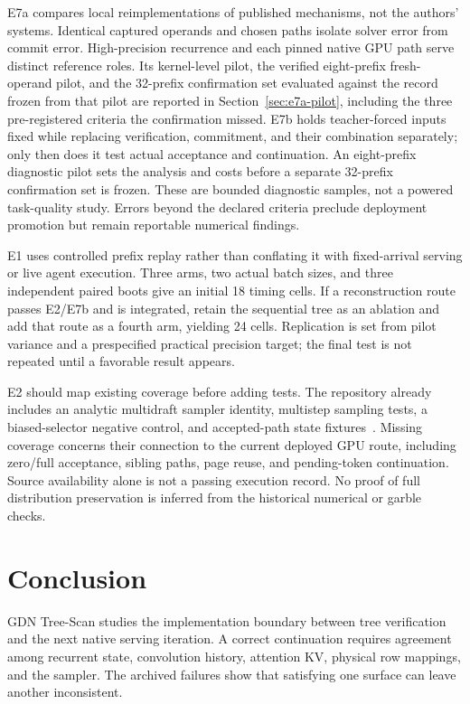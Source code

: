 \documentclass[conference]{IEEEtran}
\newcommand{\sys}{GDN Tree-Scan}
\begin{document}
E7a compares local reimplementations of published mechanisms, not the authors' systems. Identical captured operands and chosen paths isolate solver error from commit error. High-precision recurrence and each pinned native GPU path serve distinct reference roles. Its kernel-level pilot, the verified eight-prefix fresh-operand pilot, and the 32-prefix confirmation set evaluated against the record frozen from that pilot are reported in Section~\ref{sec:e7a-pilot}, including the three pre-registered criteria the confirmation missed. E7b holds teacher-forced inputs fixed while replacing verification, commitment, and their combination separately; only then does it test actual acceptance and continuation. An eight-prefix diagnostic pilot sets the analysis and costs before a separate 32-prefix confirmation set is frozen. These are bounded diagnostic samples, not a powered task-quality study. Errors beyond the declared criteria preclude deployment promotion but remain reportable numerical findings.

E1 uses controlled prefix replay rather than conflating it with fixed-arrival serving or live agent execution. Three arms, two actual batch sizes, and three independent paired boots give an initial 18 timing cells. If a reconstruction route passes E2/E7b and is integrated, retain the sequential tree as an ablation and add that route as a fourth arm, yielding 24 cells. Replication is set from pilot variance and a prespecified practical precision target; the final test is not repeated until a favorable result appears.

E2 should map existing coverage before adding tests. The repository already includes an analytic multidraft sampler identity, multistep sampling tests, a biased-selector negative control, and accepted-path state fixtures~\cite{lumo2026archive}. Missing coverage concerns their connection to the current deployed GPU route, including zero/full acceptance, sibling paths, page reuse, and pending-token continuation. Source availability alone is not a passing execution record. No proof of full distribution preservation is inferred from the historical numerical or garble checks.

\section{Conclusion}
\sys{} studies the implementation boundary between tree verification and the next native serving iteration. A correct continuation requires agreement among recurrent state, convolution history, attention KV, physical row mappings, and the sampler. The archived failures show that satisfying one surface can leave another inconsistent.
\end{document}
